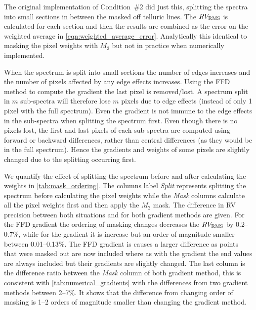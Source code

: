 The original implementation of Condition~\#2 did just this, splitting the spectra into small sections in between the masked off telluric lines.
The {\red{}\(RV_{\textrm{RMS}}\)} is calculated for each section and then the results are combined as the error on the weighted average in \cref{eqn:weighted_average_error}.
Analytically this identical to masking the pixel weights with \(M_2\) but not in practice when numerically implemented.

When the spectrum is split into small sections the number of edges increases and the number of pixels affected by any edge effects increases.
Using the {FFD} method to compute the gradient the last pixel is removed/lost.
A spectrum split in \(m\) sub-spectra will therefore lose \(m\) pixels due to edge effects (instead of only 1 pixel with the full spectrum).
Even the \numpy{} gradient is not immune to the edge effects in the sub-spectra when splitting the spectrum first.
Even though there is no pixels lost, the first and last pixels of each sub-spectra are computed using forward or backward differences, rather than central differences (as they would be in the full spectrum).
Hence the gradients and weights of some pixels are slightly changed due to the splitting occurring first.

We quantify the effect of splitting the spectrum before and after calculating the weights in \cref{tab:mask_ordering}.
The columns label \emph{Split} represents splitting the spectrum before calculating the pixel weights while the \emph{Mask} columns calculate all the pixel weights first and then apply the \(M_2\) mask.
The difference in {RV} precision between both situations and for both gradient methods are given.
For the {FFD} gradient the ordering of masking changes decreases the {\red{}\(RV_{\textrm{RMS}}\)} by 0.2--0.7\%, while for the \numpy{} gradient it is increase but an order of magnitude smaller between 0.01--0.13\%.
The {FFD} gradient is causes a larger difference as points that were masked out are now included where as with the \numpy{} gradient the end values are always included but their gradients are slightly changed.
The last column is the difference ratio between the \emph{Mask} column of both gradient method, this is consistent with \cref{tab:numerical_gradients} with the differences from two gradient methods between 2--7\%.
It shows that the difference from changing order of masking is 1--2 orders of magnitude smaller than changing the gradient method.

